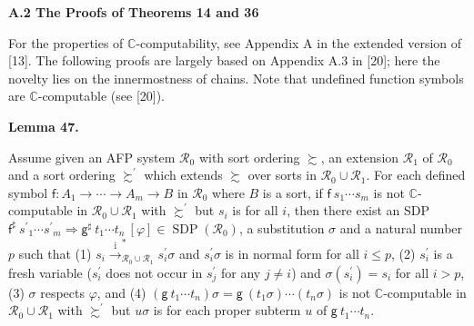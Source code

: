  
 
\par\medskip\noindent\textbf{A.2 The Proofs of Theorems 14 and 36}\par
 
 
For the properties of $\mathbb{C}$-computability, see Appendix A in the extended version of [13]. The following proofs are largely based on Appendix A.3 in [20]; here the novelty lies on the innermostness of chains. Note that undefined function symbols are $\mathbb{C}$-computable (see [20]).\par
 
 
 
\par\medskip\noindent\textbf{Lemma 47.}\par
 
 
Assume given an AFP system $\mathcal{R}_{0}$ with sort ordering $\succsim$, an extension $\mathcal{R}_{1}$ of $\mathcal{R}_{0}$ and a sort ordering $\succsim^{\prime}$ which extends $\succsim$ over sorts in $\mathcal{R}_{0}\cup\mathcal{R}_{1}$. For each defined symbol $\mathsf{f}:{A}_{1}\rightarrow\cdots\rightarrow{A}_{m}\rightarrow B$ in $\mathcal{R}_{0}$ where $B$ is a sort, if ${\mathsf{f}}\ {{s}_{1}\cdots{s}_{m}}$ is not $\mathbb{C}$-computable in $\mathcal{R}_{0}\cup\mathcal{R}_{1}$ with $\succsim^{\prime}$ but $s_{i}$ is for all $i$, then there exist an SDP ${{\mathsf{f}^{\sharp}}\ {{s^{\prime}}_{1}\cdots{s^{\prime}}_{m}}}\Rightarrow{{\mathsf{g}^{\sharp}}\ {{t}_{1}\cdots{t}_{n}}}\ [\varphi]\in\operatorname{SDP}(\mathcal{R}_{0})$, a substitution $\sigma$ and a natural number $p$ such that (1) $s_{i}\xrightarrow{\scriptscriptstyle\mathrm{i}}_{\mathcal{R}_{0}\cup\mathcal{R}_{1}}^{*}s_{i}^{\prime}\sigma$ and $s_{i}^{\prime}\sigma$ is in normal form for all $i\leq p$, (2) $s_{i}^{\prime}$ is a fresh variable ($s_{i}^{\prime}$ does not occur in $s_{j}^{\prime}$ for any $j\neq i$) and $\sigma(s_{i}^{\prime})=s_{i}$ for all $i>p$, (3) $\sigma$ respects $\varphi$, and (4) $({\mathsf{g}}\ {{t}_{1}\cdots{t}_{n}})\sigma={\mathsf{g}}\ {(t_{1}\sigma)\cdots(t_{n}\sigma)}$ is not $\mathbb{C}$-computable in $\mathcal{R}_{0}\cup\mathcal{R}_{1}$ with $\succsim^{\prime}$ but $u\sigma$ is for each proper subterm $u$ of ${\mathsf{g}}\ {{t}_{1}\cdots{t}_{n}}$.\par
 
